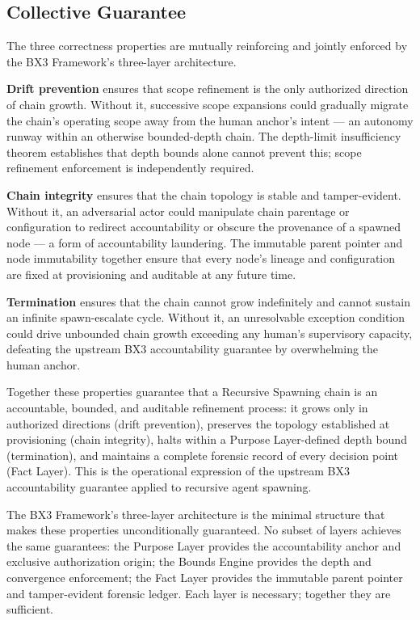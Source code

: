 \subsection{Collective Guarantee}
\label{sec:collective_guarantee}

The three correctness properties are mutually reinforcing and jointly enforced by the BX3 Framework's three-layer architecture.

\medskip
\noindent\textbf{Drift prevention} ensures that scope refinement is the only authorized direction of chain growth. Without it, successive scope expansions could gradually migrate the chain's operating scope away from the human anchor's intent --- an autonomy runway within an otherwise bounded-depth chain. The depth-limit insufficiency theorem establishes that depth bounds alone cannot prevent this; scope refinement enforcement is independently required.

\medskip
\noindent\textbf{Chain integrity} ensures that the chain topology is stable and tamper-evident. Without it, an adversarial actor could manipulate chain parentage or configuration to redirect accountability or obscure the provenance of a spawned node --- a form of accountability laundering. The immutable parent pointer and node immutability together ensure that every node's lineage and configuration are fixed at provisioning and auditable at any future time.

\medskip
\noindent\textbf{Termination} ensures that the chain cannot grow indefinitely and cannot sustain an infinite spawn-escalate cycle. Without it, an unresolvable exception condition could drive unbounded chain growth exceeding any human's supervisory capacity, defeating the upstream BX3 accountability guarantee by overwhelming the human anchor.

Together these properties guarantee that a Recursive Spawning chain is an accountable, bounded, and auditable refinement process: it grows only in authorized directions (drift prevention), preserves the topology established at provisioning (chain integrity), halts within a Purpose Layer-defined depth bound (termination), and maintains a complete forensic record of every decision point (Fact Layer). This is the operational expression of the upstream BX3 accountability guarantee applied to recursive agent spawning.

The BX3 Framework's three-layer architecture is the minimal structure that makes these properties unconditionally guaranteed. No subset of layers achieves the same guarantees: the Purpose Layer provides the accountability anchor and exclusive authorization origin; the Bounds Engine provides the depth and convergence enforcement; the Fact Layer provides the immutable parent pointer and tamper-evident forensic ledger. Each layer is necessary; together they are sufficient.